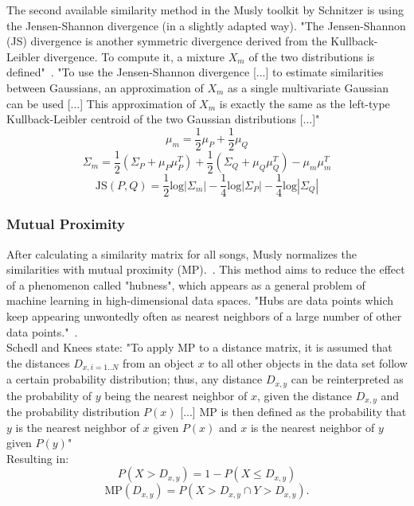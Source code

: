 The second available similarity method in the Musly toolkit by Schnitzer is using the Jensen-Shannon divergence (in a slightly adapted way). "The Jensen-Shannon (JS) divergence is another symmetric divergence derived from the Kullback-Leibler divergence. To compute it, a mixture $X_m$ of the two distributions is defined"~\cite[p. 43]{schnitzer1}. "To use the Jensen-Shannon divergence [...] to estimate similarities between Gaussians, an approximation of $X_m$ as a single multivariate Gaussian can be used [...] This approximation of $X_m$ is exactly the same as the left-type Kullback-Leibler centroid of the two Gaussian distributions [...]"~\cite[p. 45]{schnitzer1} 
\begin{equation} \label{eq:jsl1}
\mu_m = \frac{1}{2} \mu_P + \frac{1}{2} \mu_Q
\end{equation}
\begin{equation} \label{eq:jsl2}
\Sigma_m = \frac{1}{2} (\Sigma_P + \mu_P\mu_P^T) + \frac{1}{2} (\Sigma_Q + \mu_Q\mu_Q^T) - \mu_m\mu_m^T
\end{equation}
\begin{equation} \label{eq:jsl3}
\text{JS}(P, Q) = \frac{1}{2} \text{log}|\Sigma_m| - \frac{1}{4} \text{log} |\Sigma_P| - \frac{1}{4} \text{log} |\Sigma_Q|
\end{equation}

\subsubsection{Mutual Proximity}\label{mprox}
After calculating a similarity matrix for all songs, Musly normalizes the similarities with mutual proximity (MP).~\cite{musly2}. This method aims to reduce the effect of a phenomenon called "hubness", which appears as a general problem of machine learning in high-dimensional data spaces. "Hubs are data points which keep appearing unwontedly often as nearest neighbors of a large number of other data points."~\cite[p. 66]{schnitzer1}.\\
Schedl and Knees state: "To apply MP to a distance matrix, it is assumed that the distances $D_{x,i = 1..N}$ from an object $x$ to all other objects in the data set follow a certain probability distribution; thus, any distance $D_{x,y}$ can be reinterpreted as the probability of $y$ being the nearest neighbor of $x$, given the distance $D_{x,y}$ and the probability distribution $P(x)$ [...] MP is then defined as the probability that $y$ is the nearest neighbor of $x$ given $P(x)$ and $x$ is the nearest neighbor of $y$ given $P(y)$"~\cite[p. 80]{knees1}\\
Resulting in: 
\begin{equation} \label{eq:mp1}
P(X > D_{x,y}) = 1 - P(X \leq D_{x,y})%
\end{equation}
\begin{equation} \label{eq:mp2}
\text{MP}(D_{x,y}) = P(X > D_{x,y} \cap Y > D_{x,y}).
\end{equation}

